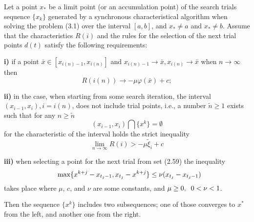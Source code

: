 \begin{theorem}
\label{theor:3_1}
	Let a point $x_\ast$ be a limit point (or an accumulation point) of the search trials sequence $\{x_k\}$  generated by a synchronous characteristical algorithm when solving the problem (3.1) over the interval $[a, b]$, and $x_\ast \neq a$  and $x_\ast \neq b $. Assume that the characteristics $R(i)$ and the rules for the selection of the next trial points $d(t)$ satisfy the following requirements:
	
	\textbf{i)} if a point $\bar{x} \in [x_{i(n)-1}, x_{i(n)}]$ and $x_{i(n)-1} \to \bar{x}, x_{i(n)} \to \bar{x}$ when $n \to \infty $  then
	\begin{equation}
	\label{eq:3_7}
	R(i(n)) \to - \mu \varphi(\bar{x}) + c;
	\end{equation}
	
	\textbf{ii)} in the case, when starting from some search iteration, the interval $(x_{i-1}, x_i), i=i(n)$, does not include trial points, i.e., a number $\tilde{n} \ge 1$ exists such that for any $n \ge \tilde{n}$
	\begin{equation}
	\label{eq:3_8}
	(x_{i-1} ,x_{i} )\bigcap \{ x^{k} \} =\emptyset
	\end{equation}
	for the characteristic of the interval holds the strict inequality
	\begin{equation}
	\label{eq:3_9}
	\mathop{\lim }\limits_{n\to \infty } R(i)>-\mu \tilde{\xi }_{i} +c
	\end{equation}
	
	\textbf{iii)} when selecting a point for the next trial from set (2.59) the inequality 
	\begin{equation}
	\label{eq:3_10}
	{\rm \; \; }\max \{ x^{k+j} -x_{t_{j} -1} ,x_{t_{j} } -x^{k+j} \} \le \nu (x_{t_{j} } -x_{t_{j} -1} )
	\end{equation}
	takes place where $\mu$, $c$, and $\nu$ are some constants, and $\mu \ge 0,{\rm \; \; }0<\nu <1$.
	
	Then the sequence $\{ x^{k} \} $ includes two subsequences; one of those converges to $x^{*} $ from the left, and another one from the right.
	\end{theorem}
